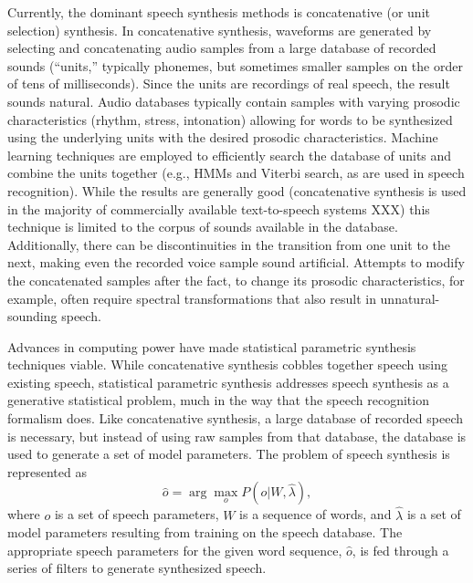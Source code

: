 \documentclass{article}
\begin{document}
Currently, the dominant speech synthesis
methods is concatenative (or unit selection) synthesis.
In concatenative synthesis, waveforms are generated
by selecting and concatenating audio samples
from a large database of recorded sounds
(``units,'' typically phonemes, but sometimes
smaller samples on the order of tens of milliseconds).
Since the units are recordings of real speech,
the result sounds natural.
Audio databases typically contain samples with
varying prosodic characteristics
(rhythm, stress, intonation)
allowing for words to be synthesized
using the underlying units
with the desired prosodic characteristics.
Machine learning techniques
are employed to efficiently search
the database of units and combine
the units together
(e.g., HMMs and Viterbi search,
as are used in speech recognition).
While the results are generally good
(concatenative synthesis is used in
the majority of commercially available
text-to-speech systems XXX) %
this technique is limited to the corpus
of sounds available in the database.
Additionally, there can be discontinuities
in the transition from one unit
to the next, making even the recorded
voice sample sound artificial.
Attempts to modify the concatenated
samples after the fact,
to change its prosodic characteristics,
for example, often require
spectral transformations that also
result in unnatural-sounding speech.

Advances in computing power
have made statistical parametric synthesis
techniques viable.
While concatenative synthesis
cobbles together speech using existing speech,
statistical parametric synthesis
addresses speech synthesis
as a generative statistical problem,
much in the way that
the speech recognition formalism does.
Like concatenative synthesis,
a large database of recorded speech is necessary,
but instead of using
raw samples from that database,
the database is used to generate
a set of model parameters.
The problem of speech synthesis
is represented as
\begin{equation}
  \hat{o} = \arg \max_o P(o|W, \hat{\lambda}),
\end{equation}
where $o$ is a set of speech parameters,
$W$ is a sequence of words,
and $\hat{\lambda}$ is a set of model parameters
resulting from training on the speech database.
The appropriate speech parameters
for the given word sequence, $\hat{o}$,
is fed through a series of filters
to generate synthesized speech.
\end{document}
